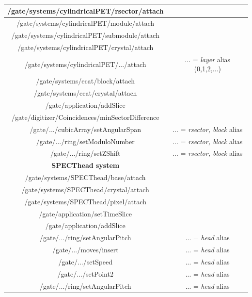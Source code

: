 \documentclass[a4paper, 11pt]{article}
\begin{document}
\begin{table} [h!]
\begin{center}
\begin{tabular}{|c|c|}
  /gate/systems/cylindricalPET/rsector/attach &  \\ \hline
  /gate/systems/cylindricalPET/module/attach &  \\ \hline       
  /gate/systems/cylindricalPET/submodule/attach &  \\ \hline      
  /gate/systems/cylindricalPET/crystal/attach &  \\ \hline
  /gate/systems/cylindricalPET/.../attach &  ... = \textit{layer} alias (0,1,2,...) \\ \hline
  
  /gate/systems/ecat/block/attach &  \\ \hline
  /gate/systems/ecat/crystal/attach &  \\ \hline

  /gate/application/addSlice &  \\ \hline
  /gate/digitizer/Coincidences/minSectorDifference &  \\ \hline
  /gate/.../cubicArray/setAngularSpan & ... = \textit{rsector, block} alias  \\ \hline
  /gate/.../ring/setModuloNumber & ... = \textit{rsector, block} alias  \\ \hline
  /gate/.../ring/setZShift & ... = \textit{rsector, block} alias  \\ \hline

  \cellcolor{blue!25}\textbf{SPECThead system}& \cellcolor{blue!25} \\ \hline

  /gate/systems/SPECThead/base/attach &  \\ \hline
  /gate/systems/SPECThead/crystal/attach &  \\ \hline
  /gate/systems/SPECThead/pixel/attach &  \\ \hline

  /gate/application/setTimeSlice &  \\ \hline
  /gate/application/addSlice &  \\ \hline
  /gate/.../ring/setAngularPitch & ... = \textit{head} alias  \\ \hline
  /gate/.../moves/insert & ... = \textit{head} alias  \\ \hline
  /gate/.../setSpeed & ... = \textit{head} alias  \\ \hline
  /gate/.../setPoint2 & ... = \textit{head} alias  \\ \hline
  /gate/.../ring/setAngularPitch & ... = \textit{head} alias  \\ \hline

  \end{tabular}
  \end{center}
\end{table}
\end{document}
